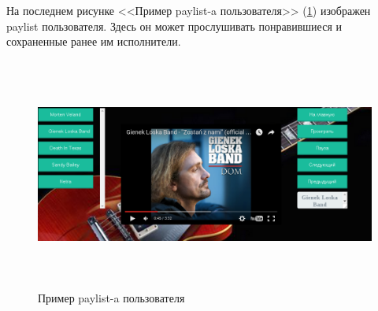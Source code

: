 На последнем рисунке <<Пример paylist-a пользователя>> (\ref{pic:lf-screen4}) изображен paylist пользователя. Здесь он может прослушивать понравившиеся и сохраненные ранее им исполнители.
\begin{figure}[h]
\caption{Пример paylist-a пользователя}
\label{pic:lf-screen4}
\begin{center}
  \includegraphics[width=5in,height=3in]{pics/lastfm-mylist.png}
\end{center}
\end{figure}
